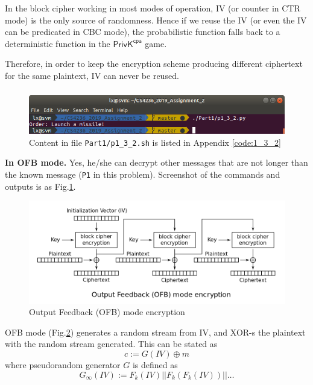 In the block cipher working in most modes of operation, IV (or counter in CTR mode) is the only source of randomness.
Hence if we reuse the IV (or even the IV can be predicated in CBC mode), the probabilistic function falls back to a deterministic function in the $\mathsf{PrivK}^{\mathsf{cpa}}$ game.

Therefore, in order to keep the encryption scheme producing different ciphertext for the same plaintext, IV can never be reused.

\subsubsection{}

\begin{figure}[tb!]
\centering
\includegraphics[width=\columnwidth]{pictures/p1_3_2.png}
\caption{
    Content in file \texttt{Part1/p1\_3\_2.sh} is listed in Appendix \ref{code:1_3_2}
}
\label{fig:p1_3_2}
\end{figure}

\textbf{In OFB mode.}
Yes, he/she can decrypt other messages that are not longer than the known message (\texttt{P1} in this problem). Screenshot of the commands and outputs is as Fig.\ref{fig:p1_3_2}.

\begin{figure}[ht!]
\centering
\includegraphics[width=\columnwidth]{pictures/OFB_encryption.png}
\caption{
    Output Feedback (OFB) mode encryption
}
\label{fig:OFB_encryption}
\end{figure}

OFB mode (Fig.\ref{fig:OFB_encryption}) generates a random stream from IV, and XOR-s the plaintext with the random stream generated. 
This can be stated as $$ c := G(IV) \oplus m $$ where pseudorandom generator $G$ is defined as $$
G_\infty(IV) := F_k(IV) || F_k(F_k(IV)) || \ldots
$$

